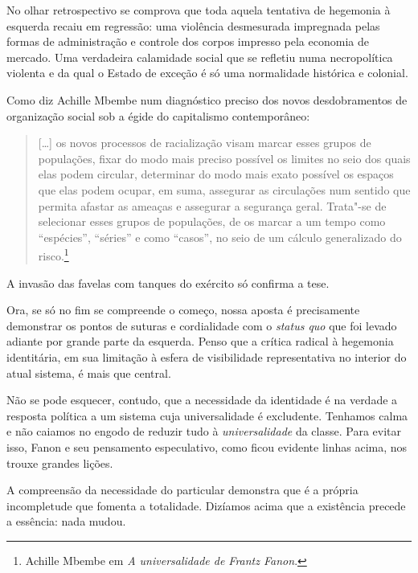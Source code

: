 No olhar retrospectivo se comprova que toda aquela tentativa de
hegemonia à esquerda recaiu em regressão: uma violência desmesurada
impregnada pelas formas de administração e controle dos corpos impresso
pela economia de mercado. Uma verdadeira calamidade social que se
refletiu numa necropolítica violenta e da qual o Estado de exceção é só
uma normalidade histórica e colonial.

Como diz Achille Mbembe num diagnóstico preciso dos novos desdobramentos
de organização social sob a égide do capitalismo contemporâneo:

\begin{quote}
{[}\ldots{}{]} os novos processos de racialização visam marcar esses grupos
de populações, fixar do modo mais preciso possível os limites no seio
dos quais elas podem circular, determinar do modo mais exato possível os
espaços que elas podem ocupar, em suma, assegurar as circulações num
sentido que permita afastar as ameaças e assegurar a segurança geral.
Trata"-se de selecionar esses grupos de populações, de os marcar a um
tempo como ``espécies'', ``séries'' e como ``casos'', no seio de um cálculo
generalizado do risco.\footnote{Achille Mbembe em \emph{A universalidade
  de Frantz Fanon}.}
\end{quote}

A invasão das favelas com tanques do exército só confirma a tese.

Ora, se só no fim se compreende o começo, nossa aposta é precisamente
demonstrar os pontos de suturas e cordialidade com o \emph{status quo}
que foi levado adiante por grande parte da esquerda. Penso que a crítica
radical à hegemonia identitária, em sua limitação à esfera de
visibilidade representativa no interior do atual sistema, é mais que
central.

Não se pode esquecer, contudo, que a necessidade da identidade é na
verdade a resposta política a um sistema cuja universalidade é
excludente. Tenhamos calma e não caiamos no engodo de reduzir tudo à
\emph{universalidade} da classe. Para evitar isso, Fanon e seu
pensamento especulativo, como ficou evidente linhas acima, nos trouxe
grandes lições.

A compreensão da necessidade do particular demonstra que é a própria
incompletude que fomenta a totalidade. Dizíamos acima que a existência
precede a essência: nada mudou.


